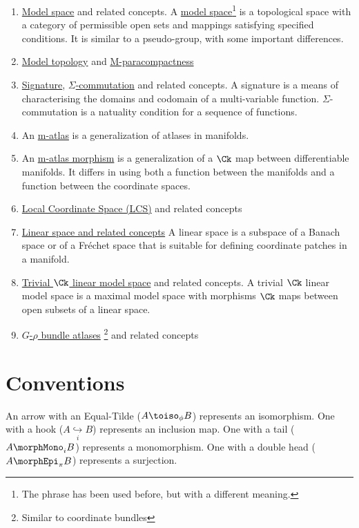 \documentclass{article}
\begin{document}
\begin{enumerate}
\item \hyperref[def:model]{Model space} and related concepts.
A \hyperref[def:model]{model space}\footnote{
  The phrase has been used before, but with a different meaning.
}
is a topological space with a category of permissible open sets and
mappings satisfying specified conditions.  It is similar to a
pseudo-group, with some important differences.

\item \hyperref[def:ModTop]{Model topology} and
\hyperref[def:M-para]{M-paracompactness}

\item \hyperref[sec:sig]{Signature},
\hyperref[def:Sigmacomm]{$\Sigma$-commutation} and related concepts.
A signature is a means of characterising the domains and codomain of a
multi-variable function.
$\Sigma$-commutation is a natuality condition for a sequence of functions.

\item
An \hyperref[def:M-atlas]{m-atlas} is a generalization of atlases in
manifolds.

\item
An \hyperref[def:M-ATLmorph]{m-atlas morphism} is a generalization of a
$\Ck$ map between differentiable manifolds. It differs in using both a
function between the manifolds and a function between the coordinate
spaces.

\item
\hyperref[def:LCS]{Local Coordinate Space (LCS)} and related concepts

\item
\hyperref[def:lin]{Linear space and related concepts}
A linear space is a subspace of a Banach space or of a Fr\'echet space
that is suitable for defining coordinate patches in a manifold.

\item
\hyperref[def:trivck]{Trivial $\Ck$ linear model space} and related
concepts.
A trivial $\Ck$ linear model space is a maximal model space
with morphisms $\Ck$ maps between open subsets of a linear space.

\item \hyperref[def:Bun-Atl]{$G$-$\rho$ bundle atlases}%
\footnote{Similar to coordinate bundles}
and related concepts
\end{enumerate}

\part {Conventions}
\label{part:conv}
An arrow with an Equal-Tilde ($A \toiso_\phi B$) represents an
isomorphism. One with a hook ($A \underset{i}{\hookrightarrow} B$)
represents an inclusion map. One with a tail ($A \morphMono_i B$) represents
a monomorphism. One with a double head ($A \morphEpi_\pi B$) represents a
surjection.
\end{document}
